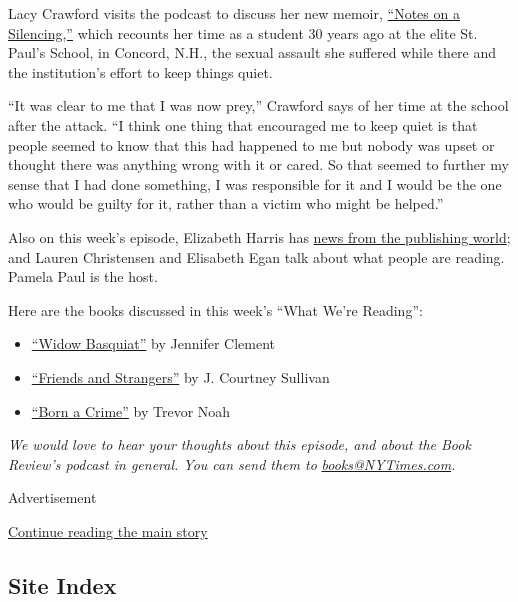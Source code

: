 Lacy Crawford visits the podcast to discuss her new memoir,
\href{https://www.nytimes3xbfgragh.onion/2020/07/07/books/review/notes-on-a-silencing-lacy-crawford.html}{``Notes
on a Silencing,''} which recounts her time as a student 30 years ago at
the elite St. Paul's School, in Concord, N.H., the sexual assault she
suffered while there and the institution's effort to keep things quiet.

``It was clear to me that I was now prey,'' Crawford says of her time at
the school after the attack. ``I think one thing that encouraged me to
keep quiet is that people seemed to know that this had happened to me
but nobody was upset or thought there was anything wrong with it or
cared. So that seemed to further my sense that I had done something, I
was responsible for it and I would be the one who would be guilty for
it, rather than a victim who might be helped.''

Also on this week's episode, Elizabeth Harris has
\href{https://www.nytimes3xbfgragh.onion/2020/07/15/books/book-publishing-leadership.html}{news
from the publishing world}; and Lauren Christensen and Elisabeth Egan
talk about what people are reading. Pamela Paul is the host.

Here are the books discussed in this week's ``What We're Reading'':

\begin{itemize}
\item
  \href{https://www.penguinrandomhouse.com/books/246904/widow-basquiat-by-jennifer-clement/}{``Widow
  Basquiat''} by Jennifer Clement
\item
  \href{https://www.nytimes3xbfgragh.onion/2020/06/26/books/review/friends-and-strangers-j-courtney-sullivan.html}{``Friends
  and Strangers''} by J. Courtney Sullivan
\item
  \href{https://www.nytimes3xbfgragh.onion/2016/11/28/books/review-born-a-crime-trevor-noahs-raw-account-of-life-under-apartheid.html}{``Born
  a Crime''} by Trevor Noah
\end{itemize}

\emph{We would love to hear your thoughts about this episode, and about
the Book Review's podcast in general. You can send them to}
\href{mailto:books@NYTimes.com}{\emph{books@NYTimes.com}}\emph{.}

Advertisement

\protect\hyperlink{after-bottom}{Continue reading the main story}

\hypertarget{site-index}{%
\subsection{Site Index}\label{site-index}}

